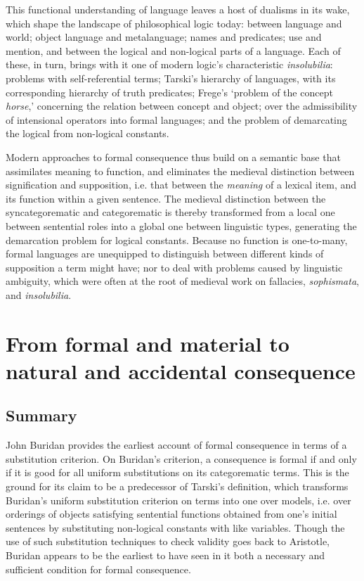 This functional understanding of language leaves a host of dualisms in its wake, which shape the landscape of philosophical logic today: between language and world; object language and metalanguage; names and predicates; use and mention, and between the logical and non-logical parts of a language. Each of these, in turn, brings with it one of modern logic's characteristic \textit{insolubilia}: problems with self-referential terms; Tarski's hierarchy of languages, with its corresponding hierarchy of truth predicates; Frege's `problem of the concept \textit{horse},' concerning the relation between concept and object; over the admissibility of intensional operators into formal languages; and the problem of demarcating the logical from non-logical constants.

Modern approaches to formal consequence thus build on a semantic base that assimilates meaning to function, and eliminates the medieval distinction between signification and supposition, i.e. that between the \textit{meaning} of a lexical item, and its function within a given sentence. The medieval distinction between the syncategorematic and categorematic is thereby transformed from a local one between sentential roles into a global one between linguistic types, generating the demarcation problem for logical constants. Because no function is one-to-many, formal languages are unequipped to distinguish between different kinds of supposition a term might have; nor to deal with problems caused by linguistic ambiguity, which were often at the root of medieval work on fallacies, \textit{sophismata}, and \textit{insolubilia}.

\section[From formal to natural consequence]{From formal and material to natural and accidental consequence}
\subsection{Summary}
John Buridan provides the earliest account of formal consequence in terms of a substitution criterion. On Buridan's criterion, a consequence is formal if and only if it is good for all uniform substitutions on its categorematic terms. This is the ground for its claim to be a predecessor of Tarski's definition, which transforms Buridan's uniform substitution criterion on terms into one over models, i.e. over orderings of objects satisfying sentential functions obtained from one's initial sentences by substituting non-logical constants with like variables. Though the use of such substitution techniques to check validity goes back to Aristotle, Buridan appears to be the earliest to have seen in it both a necessary and sufficient condition for formal consequence.

